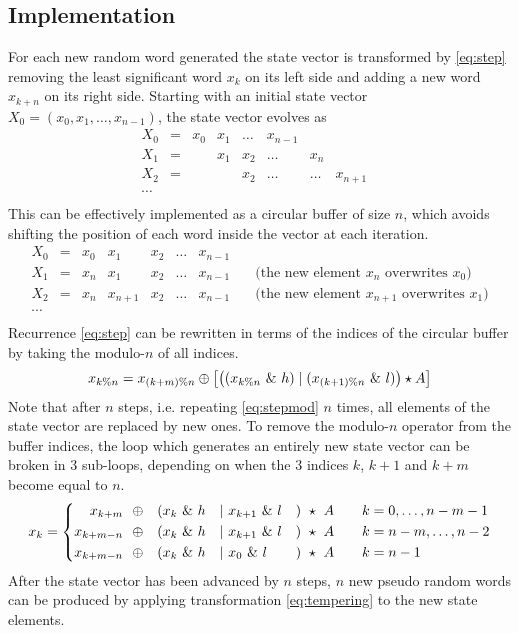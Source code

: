 \documentclass[preprint,1p,times]{elsarticle}
\begin{document}
	\subsection{Implementation}
	For each new random word generated the state vector is transformed by \eqref{eq:step} removing the least significant word $x_{k}$ on its left side and adding a new word $x_{k+n}$ on its right side. Starting with an initial state vector $X_0=(x_0, x_1, \dots, x_{n-1})$, the state vector evolves as
	$$
	\begin{matrix}
		X_0 &=& x_0 & x_1 & \dots & x_{n-1} &\\
		X_1 &=& & x_1 & x_2 & \dots & x_{n} & \\
		X_2 &=& & & x_2 & \dots & \dots & x_{n+1} &\\
		\cdots \\
	\end{matrix}
	$$
	This can be effectively implemented as a circular buffer of size $n$, which avoids shifting the position of each word inside the vector at each iteration.
	\begin{equation}
		\label{eq:staterec}
		\begin{matrix}
			X_0 &=& x_0 & x_1 & x_2 & \dots & x_{n-1} \\
			X_1 &=& x_{n} & x_1 & x_2 & \dots & x_{n-1} & \quad\text{(the new element $x_n$ overwrites $x_0$)} \\
			X_2 &=& x_{n} & x_{n+1} & x_2 & \dots & x_{n-1} & \quad\text{(the new element $x_{n+1}$ overwrites $x_1$)}\\
			\cdots \\
		\end{matrix}
	\end{equation}
	Recurrence \eqref{eq:step} can be rewritten in terms of the indices of the circular buffer by taking the modulo-$n$ of all indices.
	\begin{equation}
		\label{eq:stepmod}
		x_{k\%n} = x_{(k+m)\% n} \mathbin{\oplus} \left[ \left(({x_{k\%n}}~\&~h) \mid (x_{(k+1)\%n}~\&~l)\right) \star A \right]
	\end{equation}
	Note that after $n$ steps, i.e. repeating \eqref{eq:stepmod} $n$ times, all elements of the state vector are replaced by new ones. To remove the modulo-$n$ operator from the buffer indices, the loop which generates an entirely new state vector can be broken in 3 sub-loops, depending on when the 3 indices $k$, $k+1$ and $k+m$ become equal to $n$.
	\begin{equation}
		\label{eq:stepnomod}
		x_k = \left\{
		\begin{aligned}
			x_{k+m}   & ~~\mathbin{\oplus} & ( & x_{k} ~\&~ h & \mid~ & x_{k+1} ~\&~ l & ) &~\star~ A &\quad &k = 0, \dots, n-m-1\\
			x_{k+m-n} & ~~\mathbin{\oplus} & ( & x_{k} ~\&~ h & \mid~ & x_{k+1} ~\&~ l & ) &~\star~ A &\quad &k = n-m, \dots, n-2 \\
			x_{k+m-n} & ~~\mathbin{\oplus} & ( & x_{k} ~\&~ h & \mid~ & x_{0}   ~\&~ l & ) &~\star~ A &\quad &k = n-1
		\end{aligned}
		\right.
	\end{equation}
	After the state vector has been advanced by $n$ steps, $n$ new pseudo random words can be produced by applying transformation \eqref{eq:tempering} to the new state elements.
	
\end{document}
